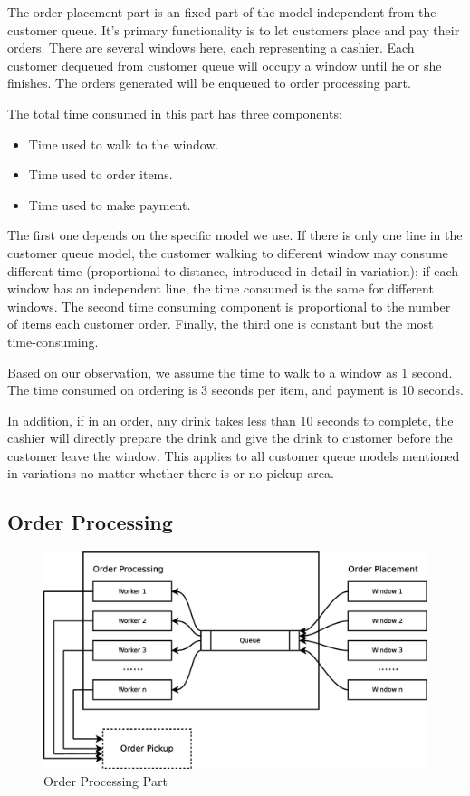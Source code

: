 \documentclass[a4paper]{article}
\begin{document}
The order placement part is an fixed part of the model independent from the customer queue. It's primary functionality is to let customers place and pay their orders. There are several windows here, each representing a cashier. Each customer dequeued from customer queue will occupy a window until he or she finishes. The orders generated will be enqueued to order processing part. 

\newpage

\noindent The total time consumed in this part has three components:

\begin{itemize}
\item Time used to walk to the window.
\item Time used to order items.
\item Time used to make payment.
\end{itemize}

The first one depends on the specific model we use. If there is only one line in the customer queue model, the customer walking to different window may consume different time (proportional to distance, introduced in detail in variation); if each window has an independent line, the time consumed is the same for different windows. The second time consuming component is proportional to the number of items each customer order. Finally, the third one is constant but the most time-consuming.

Based on our observation, we assume the time to walk to a window as 1 second. The time consumed on ordering is 3 seconds per item, and payment is 10 seconds.

In addition, if in an order, any drink takes less than 10 seconds to complete, the cashier will directly prepare the drink and give the drink to customer before the customer leave the window. This applies to all customer queue models mentioned in variations no matter whether there is or no pickup area.

\subsection{Order Processing}

\begin{figure}[H]
	\centering
	\includegraphics[width=0.50\textheight]{order_processing}
	\caption{Order Processing Part}
\end{figure}
\end{document}
